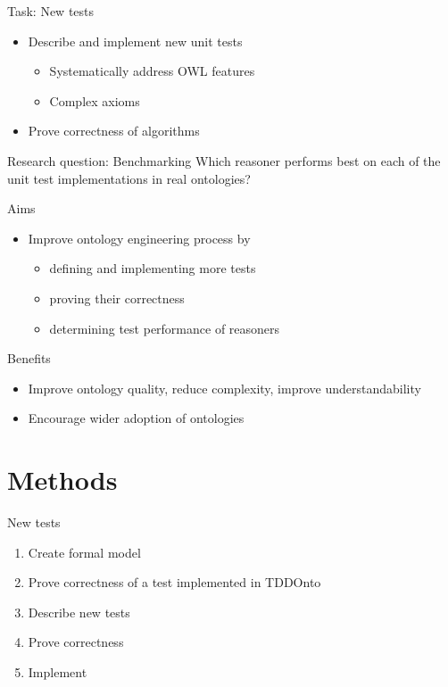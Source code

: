 \documentclass[17pt,mathserif]{beamer}
\begin{document}
\begin{frame}{Task: New tests}
  \begin{itemize}
    \item Describe and implement new unit tests
    \begin{itemize}
      \item Systematically address OWL features
      \item Complex axioms
    \end{itemize}
    \item Prove correctness of algorithms
  \end{itemize}
\end{frame}

\begin{frame}{Research question: Benchmarking}
  \centering
  Which reasoner performs best on each of the unit test implementations in real ontologies?
\end{frame}

\begin{frame}{Aims}
  \begin{itemize}
    \item Improve ontology engineering process by
    \begin{itemize}
      \item defining and implementing more tests
      \item proving their correctness
      \item determining test performance of reasoners
    \end{itemize}
  \end{itemize}
\end{frame}

\begin{frame}{Benefits}
  \begin{itemize}
    \item Improve ontology quality, reduce complexity, improve understandability
    \item Encourage wider adoption of ontologies
  \end{itemize}
\end{frame}

\section{Methods}

\begin{frame}{New tests}
  \begin{enumerate}
    \item Create formal model
    \item Prove correctness of a test implemented in TDDOnto
    \item Describe new tests
    \item Prove correctness
    \item Implement
  \end{enumerate}
\end{frame}
\end{document}
